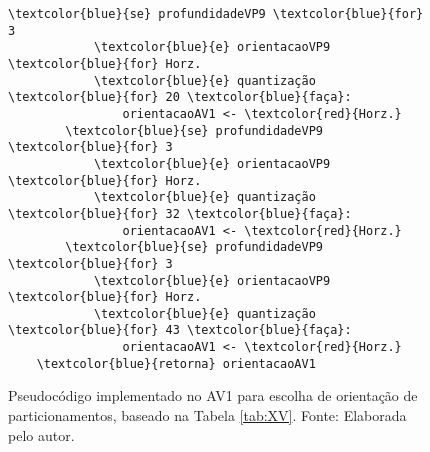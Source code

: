 \begin{figure}
\begin{Verbatim}[frame=single,commandchars=\\\{\}]
		\textcolor{blue}{se} profundidadeVP9 \textcolor{blue}{for} 3 
			\textcolor{blue}{e} orientacaoVP9 \textcolor{blue}{for} Horz. 
			\textcolor{blue}{e} quantização \textcolor{blue}{for} 20 \textcolor{blue}{faça}:
				orientacaoAV1 <- \textcolor{red}{Horz.}
		\textcolor{blue}{se} profundidadeVP9 \textcolor{blue}{for} 3 
			\textcolor{blue}{e} orientacaoVP9 \textcolor{blue}{for} Horz. 
			\textcolor{blue}{e} quantização \textcolor{blue}{for} 32 \textcolor{blue}{faça}:
				orientacaoAV1 <- \textcolor{red}{Horz.}
		\textcolor{blue}{se} profundidadeVP9 \textcolor{blue}{for} 3 
			\textcolor{blue}{e} orientacaoVP9 \textcolor{blue}{for} Horz. 
			\textcolor{blue}{e} quantização \textcolor{blue}{for} 43 \textcolor{blue}{faça}:
				orientacaoAV1 <- \textcolor{red}{Horz.}
	\textcolor{blue}{retorna} orientacaoAV1
    \end{Verbatim}
    \caption{Pseudocódigo implementado no AV1 para escolha de orientação de particionamentos, baseado na Tabela \ref{tab:XV}. Fonte: Elaborada pelo autor.}
    \label{fig:23}
\end{figure}